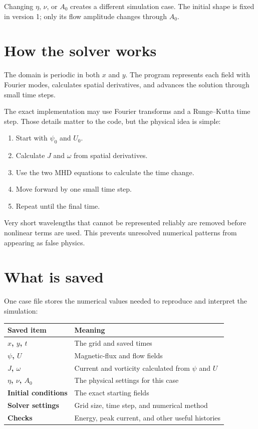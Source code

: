 \documentclass[11pt]{article}
\begin{document}
Changing $\eta$, $\nu$, or $A_0$ creates a different simulation case. The initial shape is fixed in version 1; only its flow amplitude changes through $A_0$.

\section{How the solver works}

The domain is periodic in both $x$ and $y$. The program represents each field with Fourier modes, calculates spatial derivatives, and advances the solution through small time steps.

The exact implementation may use Fourier transforms and a Runge--Kutta time step. Those details matter to the code, but the physical idea is simple:

\begin{enumerate}[leftmargin=2em]
\item Start with $\psi_0$ and $U_0$.
\item Calculate $J$ and $\omega$ from spatial derivatives.
\item Use the two MHD equations to calculate the time change.
\item Move forward by one small time step.
\item Repeat until the final time.
\end{enumerate}

Very short wavelengths that cannot be represented reliably are removed before nonlinear terms are used. This prevents unresolved numerical patterns from appearing as false physics.

\section{What is saved}

One case file stores the numerical values needed to reproduce and interpret the simulation:

\begin{center}
\begin{tabularx}{0.94\textwidth}{>{\bfseries}p{} X}
\toprule
Saved item & Meaning\\
\midrule
$x$, $y$, $t$ & The grid and saved times\\
$\psi$, $U$ & Magnetic-flux and flow fields\\
$J$, $\omega$ & Current and vorticity calculated from $\psi$ and $U$\\
$\eta$, $\nu$, $A_0$ & The physical settings for this case\\
Initial conditions & The exact starting fields\\
Solver settings & Grid size, time step, and numerical method\\
Checks & Energy, peak current, and other useful histories\\
\bottomrule
\end{tabularx}
\end{center}
\end{document}
